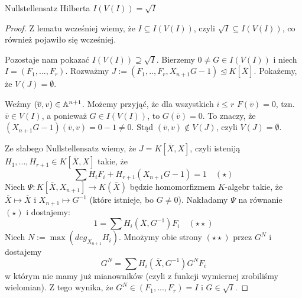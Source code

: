 \begin{conclusion}{Nullstellensatz Hilberta}{}
  $I(V(I))=\sqrt{I}$
\end{conclusion}

\begin{proof}
  Z lematu wcześniej wiemy, że $I\subseteq I(V(I))$, czyli $\sqrt{I}\subseteq I(V(I))$, co również pojawiło się wcześniej.

  Pozostaje nam pokazać $I(V(I))\supseteq \sqrt{I}$. Bierzemy $0\neq G\in I(V(I))$ i niech $I=(F_1,..., F_r)$. Rozważmy $J:=(F_1,.., F_r, X_{n+1}G-1)\trianglelefteq K[\overline{X}]$. Pokażemy, że $V(J)=\emptyset$.

  Weźmy $(\overline{v}, v)\in\mathbb{A}^{n+1}$. Możemy przyjąć, że dla wszystkich $i\leq r$ $F(\overline{v})=0$, tzn. $\overline{v}\in V(I)$, a ponieważ $G\in I(V(I))$, to $G(\overline{v})=0$. To znaczy, że $(X_{n+1}G-1)(\overline{v}, v)=0-1\neq 0$. Stąd $(\overline{v},v)\notin V(J)$, czyli $V(J)=\emptyset$.

  Ze słabego Nullstellensatz wiemy, że $J=K[\overline{X}, X]$, czyli isteniją $H_1,..., H_{r+1}\in K[\overline{X}, X]$ takie, że 
  $$\sum H_iF_i+H_{r+1}(X_{n+1}G-1)=1\quad (\star)$$
  Niech $\Psi:K[\overline{X}, X_{n+1}]\to K(\overline{X})$ będzie homomorfizmem $K$-algebr takie, że $\overline{X}\mapsto \overline{X}$ i $X_{n+1}\mapsto G^{-1}$ (które istnieje, bo $G\neq 0$). Nakładamy $\Psi$ na równanie $(\star)$ i dostajemy:
  $$1=\sum H_i(\overline{X}, G^{-1})F_i\quad (\star\star)$$
  Niech $N:=\max(deg_{X_{n+1}} H_i)$. Mnożymy obie strony $(\star\star)$ przez $G^N$ i dostajemy 
  $$G^N=\sum H_i(\overline{X}, G^{-1})G^NF_i$$
  w którym nie mamy już mianowników (czyli z funkcji wymiernej zrobiliśmy wielomian). Z tego wynika, że $G^N\in(F_1,..., F_r)=I$ i $G\in\sqrt{I}$.
\end{proof}
